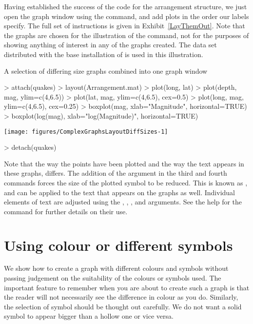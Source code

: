 Having established the success of the code for the arrangement structure, we just open the graph window using the  command, and add plots in the order our labels specify. The full set of instructions is given in Exhibit~\ref{LayThemOut}. Note that the graphs are chosen for the illustration of the  command, not for the purposes of showing anything of interest in any of the graphs created. The  data set distributed with the base installation of \R{} is used in this illustration. 
\begin{exhibit} 
\begin{center} 
\caption{A selection of differing size graphs combined into one graph window} 
\label{LayThemOut} 
\begin{Schunk}
\begin{Sinput}
> attach(quakes) 
> layout(Arrangement.mat) 
> plot(long, lat) 
> plot(depth, mag, ylim=c(4,6.5)) 
> plot(lat, mag, ylim=c(4,6.5), cex=0.5) 
> plot(long, mag, ylim=c(4,6.5), cex=0.25) 
> boxplot(mag, xlab="Magnitude", horizontal=TRUE) 
> boxplot(log(mag), xlab="log(Magnitude)", horizontal=TRUE) 
\end{Sinput}

\texttt{[image: figures/ComplexGraphsLayoutDiffSizes-1]} \begin{Sinput}
> detach(quakes) 
\end{Sinput}
\end{Schunk}
\end{center} 
\end{exhibit} 
 
Note that the way the points have been plotted and the way the text appears in these graphs, differs. The addition of the  argument in the third and fourth  commands forces the size of the plotted symbol to be reduced. This is known as , and can be applied to the text that appears on the graphs as well. Individual elements of text are adjusted using the , , , and  arguments. See the help for the  command for further details on their use. 
 
\section{Using colour or different symbols} 
 
We show how to create a graph with different colours and symbols without passing judgement on the suitability of the colours or symbols used. The important feature to remember when you are about to create such a graph is that the reader will not necessarily see the difference in colour as you do. Similarly, the selection of symbol should be thought out carefully. We do not want a solid symbol to appear bigger than a hollow one or vice versa. 
 
